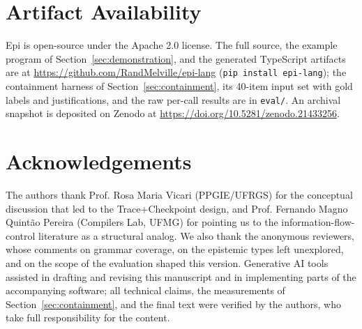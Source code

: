\documentclass[sigconf]{acmart}
\begin{document}
\section*{Artifact Availability}

Epi is open-source under the Apache 2.0 license. The full source, the example program of Section~\ref{sec:demonstration}, and the generated TypeScript artifacts are at \url{https://github.com/RandMelville/epi-lang} (\texttt{pip install epi-lang}); the containment harness of Section~\ref{sec:containment}, its 40-item input set with gold labels and justifications, and the raw per-call results are in \texttt{eval/}. An archival snapshot is deposited on Zenodo at \url{https://doi.org/10.5281/zenodo.21433256}.

\section*{Acknowledgements}

The authors thank Prof. Rosa Maria Vicari (PPGIE/UFRGS) for the
conceptual discussion that led to the Trace+Checkpoint design, and
Prof. Fernando Magno Quint\~{a}o Pereira (Compilers Lab, UFMG) for
pointing us to the information-flow-control literature as a
structural analog. We also thank the anonymous reviewers, whose
comments on grammar coverage, on the epistemic types left
unexplored, and on the scope of the evaluation shaped this version.
Generative AI tools assisted in drafting and revising this manuscript
and in implementing parts of the accompanying software; all technical
claims, the measurements of Section~\ref{sec:containment}, and the
final text were verified by the authors, who take full responsibility
for the content.



\end{document}
